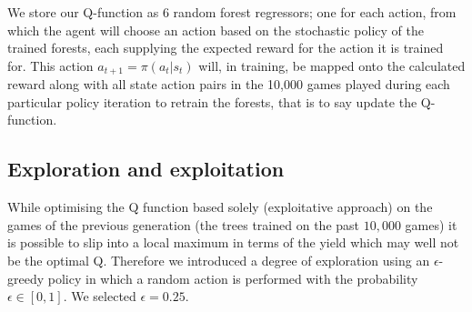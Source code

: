 	We store our Q-function as 6 random forest regressors; one for each action, from which the agent will choose an action based on the stochastic policy of the trained forests, each supplying the expected reward for the action it is trained for. This action $a_{t+1} = \pi(a_t|s_t)$ will, in training, be mapped onto the calculated reward along with all state action pairs in the 10,000 games played during each particular policy iteration to retrain the forests, that is to say update the Q-function.
	
	
	\subsection{Exploration and exploitation}
	\label{explo}
	While optimising the Q function based solely (exploitative approach) on the games of the previous generation (the trees trained on the past $10,000$ games) it is possible to slip into a local maximum in terms of the yield which may well not be the optimal Q. Therefore we introduced a degree of exploration using an $\epsilon$-greedy policy in which a random action is performed with the probability $\epsilon \in [0,1]$. We selected $\epsilon = 0.25$. \par
	

